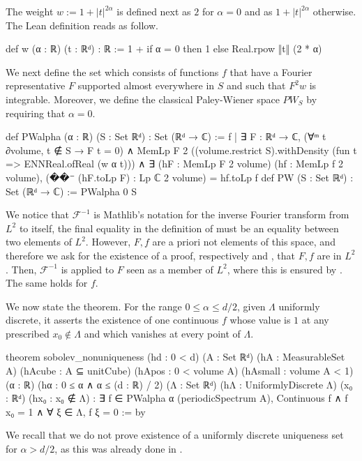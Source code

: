\documentclass[reqno,a4paper,12pt]{amsart}
\numberwithin{equation}{section}
\newcommand\1{\mathds{1}}
\providecommand{\lean}[1]{\texttt{\detokenize{#1}}}
\begin{document}
The weight
$w:=1+|t|^{2\alpha}$ is defined next as $2$ for $\alpha =0$ and as $1+|t|^{2\alpha}$ otherwise. The Lean definition reads as follow.
\begin{leancode}
    def w (α : ℝ) (t : ℝᵈ) : ℝ :=
      1 + if α = 0 then 1 else Real.rpow ‖t‖ (2 * α)
\end{leancode}
We next define the set \lean{PWalpha} which consists of functions $f$ that have a Fourier
representative $F$ supported almost everywhere in $S$ and such that $F^2w$ is integrable. Moreover, we define the classical Paley-Wiener space $PW_S$ by requiring that $\alpha=0$.
\begin{leancode}
    def PWalpha (α : ℝ) (S : Set ℝᵈ) : Set (ℝᵈ → ℂ) :=
      {f | ∃ F : ℝᵈ → ℂ,
        (∀ᵐ t ∂volume, t ∉ S → F t = 0) ∧
        MemLp F 2 ((volume.restrict S).withDensity (fun t => ENNReal.ofReal (w α t))) ∧
        ∃ (hF : MemLp F 2 volume) (hf : MemLp f 2 volume),
          (��⁻ (hF.toLp F) : Lp ℂ 2 volume) = hf.toLp f}
    def PW (S : Set ℝᵈ) : Set (ℝᵈ → ℂ) := PWalpha 0 S
\end{leancode}
We notice that $\mathcal F^{-1}$ is Mathlib's notation for the inverse Fourier transform from $L^2$ to itself, the final equality in the definition of \lean{PWalpha} must be an equality between two elements of $L^2$. However,  $F,f$ are a priori not elements of this space, and therefore we ask for the existence of a proof, respectively \lean{hF} and \lean{hf}, that $F,f$ are in $L^2$. Then, $\mathcal F^{-1}$ is applied to $F$ seen as a member of $L^2$, where this is ensured by \lean{hF}. The same holds for $f$.  

We now state the theorem. For the range
$0\leq\alpha\leq d/2$, given $\Lambda$ uniformly discrete, it asserts the existence of one continuous $f$
whose value is $1$ at any prescribed $x_0\notin\Lambda$ and which vanishes at every point of $\Lambda$.
\begin{leancode}
    theorem sobolev_nonuniqueness
      (hd : 0 < d) (A : Set ℝᵈ)
      (hA : MeasurableSet A) (hAcube : A ⊆ unitCube)
      (hApos : 0 < volume A) (hAsmall : volume A < 1)
      (α : ℝ) (hα : 0 ≤ α ∧ α ≤ (d : ℝ) / 2)
      (Λ : Set ℝᵈ) (hΛ : UniformlyDiscrete Λ)
      (x₀ : ℝᵈ) (hx₀ : x₀ ∉ Λ) :
        ∃ f ∈ PWalpha α (periodicSpectrum A),
        Continuous f ∧ f x₀ = 1 ∧ ∀ ξ ∈ Λ, f ξ = 0 := by
\end{leancode}
We recall that we do not prove existence of a uniformly discrete uniqueness
set for $\alpha>d/2$, as this was already done in \cite{OlevskiiUlanovskii2017}.
\end{document}
